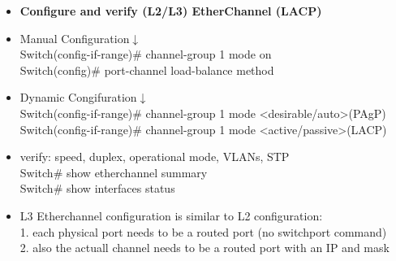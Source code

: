\documentclass{article}
\begin{document}
\begin{itemize}
  \item \textbf{Configure and verify (L2/L3) EtherChannel (LACP)}
	\item[] Manual Configuration$\downarrow$\\
		Switch(config-if-range)\# channel-group 1 mode on\\
		Switch(config)\# port-channel load-balance method
	\item[] Dynamic Congifuration$\downarrow$\\
		Switch(config-if-range)\# channel-group 1 mode \textless desirable/auto\textgreater (PAgP)\\
		Switch(config-if-range)\# channel-group 1 mode \textless active/passive\textgreater (LACP)
	\item[] verify: speed, duplex, operational mode, VLANs, STP\\
		Switch\# show etherchannel summary\\
		Switch\# show interfaces status
	\item[] L3 Etherchannel configuration is similar to L2 configuration:\\
		1. each physical port needs to be a routed port (no switchport command)\\
		2. also the actuall channel needs to be a routed port with an IP and mask\\
  

\end{itemize}
\end{document}
